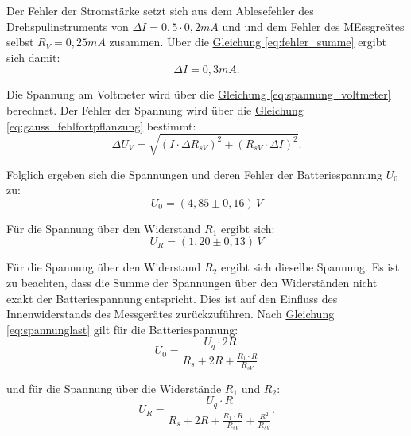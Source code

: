 Der Fehler der Stromstärke setzt sich aus dem Ablesefehler des Drehspulinstruments von $\Delta I = 0,5 \cdot 0,2mA$ und und dem Fehler des MEssgreätes selbst $R_V = 0,25mA$ zusammen. Über die \hyperref[eq:fehler_summe]{Gleichung \ref*{eq:fehler_summe}} ergibt sich damit:
\begin{equation}
    \Delta I = 0,3mA.
    \label{eq:fehler_strom}
\end{equation}

Die Spannung am Voltmeter wird über die \hyperref[eq:spannung_voltmeter]{Gleichung \ref*{eq:spannung_voltmeter}} berechnet. Der Fehler der Spannung wird über die \hyperref[eq:gauss_fehlfortpflanzung]{Gleichung \ref*{eq:gauss_fehlfortpflanzung}} bestimmt:
\begin{equation}
    \Delta U_V = \sqrt{(I \cdot \Delta R_{sV})^2 + (R_{sV} \cdot \Delta I)^2}.
\end{equation}

Folglich ergeben sich die Spannungen und deren Fehler der Batteriespannung $U_0$ zu:
\begin{equation}
    \boxed{
        U_0 = (4,85 \pm 0,16) \, V
    }
\end{equation}

Für die Spannung über den Widerstand $R_1$ ergibt sich:
\begin{equation}
    \boxed{
        U_{R} = (1,20 \pm 0,13) \, V
    }
\end{equation}

Für die Spannung über den Widerstand $R_2$ ergibt sich dieselbe Spannung. Es ist zu beachten, dass die Summe der Spannungen über den Widerständen nicht exakt der Batteriespannung entspricht. Dies ist auf den Einfluss des Innenwiderstands des Messgerätes zurückzuführen. Nach \hyperref[eq:spannunglast]{Gleichung \ref*{eq:spannunglast}} gilt für die Batteriespannung:
\begin{equation}
    U_0 = \frac{U_q \cdot 2R}{R_s + 2R +\frac{R_1 \cdot R}{R_{sV}}}
\end{equation}

und für die Spannung über die Widerstände $R_1$ und $R_2$:
\begin{equation}
    U_{R} = \frac{U_q \cdot R}{R_s + 2R +\frac{R_1 \cdot R}{R_{sV}} +\frac{R^2}{R_{sV}}}.
\end{equation}

